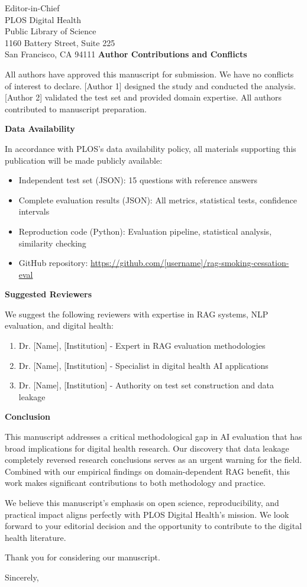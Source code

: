 \documentclass[11pt]{letter}
\begin{document}
\begin{letter}{%
Editor-in-Chief\\
PLOS Digital Health\\
Public Library of Science\\
1160 Battery Street, Suite 225\\
San Francisco, CA 94111}
\textbf{Author Contributions and Conflicts}

All authors have approved this manuscript for submission. We have no conflicts of interest to declare. [Author 1] designed the study and conducted the analysis. [Author 2] validated the test set and provided domain expertise. All authors contributed to manuscript preparation.

\textbf{Data Availability}

In accordance with PLOS's data availability policy, all materials supporting this publication will be made publicly available:
\begin{itemize}
    \item Independent test set (JSON): 15 questions with reference answers
    \item Complete evaluation results (JSON): All metrics, statistical tests, confidence intervals
    \item Reproduction code (Python): Evaluation pipeline, statistical analysis, similarity checking
    \item GitHub repository: \url{https://github.com/[username]/rag-smoking-cessation-eval}
\end{itemize}

\textbf{Suggested Reviewers}

We suggest the following reviewers with expertise in RAG systems, NLP evaluation, and digital health:

\begin{enumerate}
    \item Dr. [Name], [Institution] - Expert in RAG evaluation methodologies
    \item Dr. [Name], [Institution] - Specialist in digital health AI applications
    \item Dr. [Name], [Institution] - Authority on test set construction and data leakage
\end{enumerate}

\textbf{Conclusion}

This manuscript addresses a critical methodological gap in AI evaluation that has broad implications for digital health research. Our discovery that data leakage completely reversed research conclusions serves as an urgent warning for the field. Combined with our empirical findings on domain-dependent RAG benefit, this work makes significant contributions to both methodology and practice.

We believe this manuscript's emphasis on open science, reproducibility, and practical impact aligns perfectly with PLOS Digital Health's mission. We look forward to your editorial decision and the opportunity to contribute to the digital health literature.

Thank you for considering our manuscript.

\closing{Sincerely,}

\end{letter}
\end{document}
